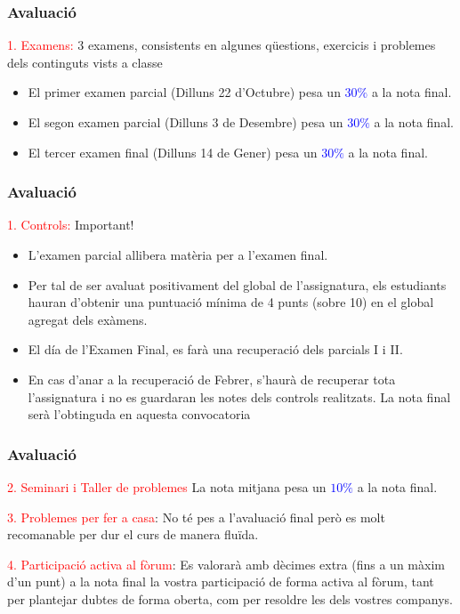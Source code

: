\documentclass[12pt,t]{beamer}
\newcommand{\red}[1]{\textcolor{red}{#1}}
\newcommand{\blue}[1]{\textcolor{blue}{#1}}
\renewcommand{\emph}[1]{{\color{red}#1}}
\theoremstyle{plain}
\theoremstyle{definition}
\begin{document}
\begin{frame}
\frametitle{Avaluació}
\medskip

\red{1. Examens:} 3 examens, consistents en algunes qüestions, exercicis i problemes dels continguts vists a classe
\bigskip

\begin{itemize}
\item El \emph{primer examen parcial} (Dilluns 22 d'Octubre) pesa un \blue{$30\%$} a la nota final.
\medskip
\item El \emph{segon examen parcial} (Dilluns 3 de Desembre) pesa un \blue{$30\%$} a la nota final.
\medskip

\item El \emph{tercer examen final} (Dilluns 14 de Gener) pesa un \blue{$30\%$} a la nota final.
\end{itemize}
\bigskip

\end{frame}


\begin{frame}
\frametitle{Avaluació}
\medskip

\red{1. Controls:} Important!
\bigskip

\begin{itemize}
\item L'examen parcial allibera matèria per a l'examen final.
\item Per tal de ser avaluat positivament del global de l'assignatura, els estudiants hauran d'obtenir una puntuació mínima de 4 punts (sobre 10) en el global agregat dels exàmens.
\item El día de l'Examen Final, es farà una recuperació dels parcials I i II. 
\item En cas d'anar a la recuperació de Febrer, s'haurà de recuperar tota l'assignatura i no es guardaran les notes dels controls realitzats. La nota final serà l'obtinguda en aquesta convocatoria

\medskip
\end{itemize}
\end{frame}




\begin{frame}
\frametitle{Avaluació}
\bigskip

\red{2. Seminari i Taller de problemes} La nota mitjana pesa un \blue{$10\%$} a la nota final.
\bigskip

\red{3. Problemes per fer a casa}: No té pes a l'avaluació final però es molt recomanable per dur el curs de manera fluïda. 

\red{4. Participació activa al fòrum}: Es valorarà amb dècimes extra (fins a un màxim d'un punt) a la nota final la vostra participació de forma activa al fòrum, tant per plantejar dubtes de forma oberta, com per resoldre les dels vostres companys. 

\end{frame}
\end{document}

